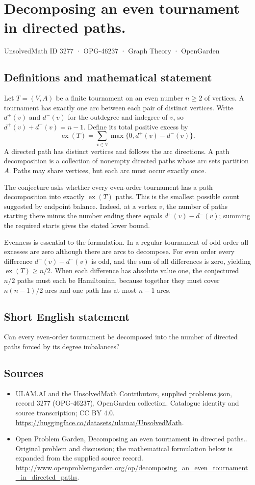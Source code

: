 \documentclass[11pt,a4paper]{article}
\begin{document}
\section*{Decomposing an even tournament in directed paths.}\label{3277}
{\small UnsolvedMath ID 3277 · OPG-46237 · Graph Theory · OpenGarden}
\subsection{Definitions and mathematical statement}
Let $T=(V,A)$ be a finite tournament on an even number $n\ge2$ of
vertices. A tournament has exactly one arc between each pair of
distinct vertices. Write $d^+(v)$ and $d^-(v)$ for the outdegree and
indegree of $v$, so $d^+(v)+d^-(v)=n-1$. Define its total positive excess
by
\[
 \operatorname{ex}(T)=\sum_{v\in V}\max\{0,d^+(v)-d^-(v)\}.
\]
A directed path has distinct vertices and follows the arc directions.
A path decomposition is a collection of nonempty directed paths whose
arc sets partition $A$. Paths may share vertices, but each arc must
occur exactly once.

The conjecture asks whether every even-order tournament has a path
decomposition into exactly $\operatorname{ex}(T)$ paths. This is the
smallest possible count suggested by endpoint balance. Indeed, at a
vertex $v$, the number of paths starting there minus the number ending
there equals $d^+(v)-d^-(v)$; summing the required starts gives the stated
lower bound.

Evenness is essential to the formulation. In a regular tournament of
odd order all excesses are zero although there are arcs to decompose.
For even order every difference $d^+(v)-d^-(v)$ is odd, and the sum of
all differences is zero, yielding $\operatorname{ex}(T)\ge n/2$.
When each difference has absolute value one, the conjectured $n/2$
paths must each be Hamiltonian, because together they must cover
$n(n-1)/2$ arcs and one path has at most $n-1$ arcs.
\subsection{Short English statement}
Can every even-order tournament be decomposed into the number of directed paths forced by its degree imbalances?
\subsection{Sources}
\begin{itemize}
\item[S1] ULAM.AI and the UnsolvedMath Contributors, supplied problems.json, record 3277 (OPG-46237), OpenGarden collection. Catalogue identity and source transcription; CC BY 4.0.
\url{https://huggingface.co/datasets/ulamai/UnsolvedMath}.
\item[S2] Open Problem Garden, Decomposing an even tournament in directed paths.. Original problem and discussion; the mathematical formulation below is expanded from the supplied source record.
\url{http://www.openproblemgarden.org/op/decomposing_an_even_tournament_in_directed_paths}.
\end{itemize}
\end{document}
